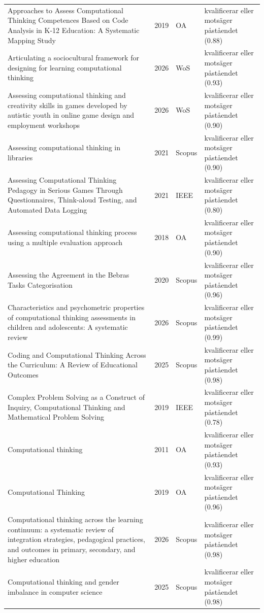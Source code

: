 \begin{longtable}{@{}%
  >{\raggedright\arraybackslash}p{}c%
  >{\raggedright\arraybackslash}p{}%
  >{\raggedright\arraybackslash}p{}@{}}
Approaches to Assess Computational Thinking Competences Based on Code Analysis in K-12 Education: A Systematic Mapping Study & 2019 & OA & kvalificerar eller motsäger påståendet (0.88) \\
Articulating a sociocultural framework for designing for learning computational thinking & 2026 & WoS & kvalificerar eller motsäger påståendet (0.93) \\
Assessing computational thinking and creativity skills in games developed by autistic youth in online game design and employment workshops & 2026 & WoS & kvalificerar eller motsäger påståendet (0.90) \\
Assessing computational thinking in libraries & 2021 & Scopus & kvalificerar eller motsäger påståendet (0.90) \\
Assessing Computational Thinking Pedagogy in Serious Games Through Questionnaires, Think-aloud Testing, and Automated Data Logging & 2021 & IEEE & kvalificerar eller motsäger påståendet (0.80) \\
Assessing computational thinking process using a multiple evaluation approach & 2018 & OA & kvalificerar eller motsäger påståendet (0.90) \\
Assessing the Agreement in the Bebras Tasks Categorisation & 2020 & Scopus & kvalificerar eller motsäger påståendet (0.96) \\
Characteristics and psychometric properties of computational thinking assessments in children and adolescents: A systematic review & 2026 & Scopus & kvalificerar eller motsäger påståendet (0.99) \\
Coding and Computational Thinking Across the Curriculum: A Review of Educational Outcomes & 2025 & Scopus & kvalificerar eller motsäger påståendet (0.98) \\
Complex Problem Solving as a Construct of Inquiry, Computational Thinking and Mathematical Problem Solving & 2019 & IEEE & kvalificerar eller motsäger påståendet (0.78) \\
Computational thinking & 2011 & OA & kvalificerar eller motsäger påståendet (0.93) \\
Computational Thinking & 2019 & OA & kvalificerar eller motsäger påståendet (0.96) \\
Computational thinking across the learning continuum: a systematic review of integration strategies, pedagogical practices, and outcomes in primary, secondary, and higher education & 2026 & Scopus & kvalificerar eller motsäger påståendet (0.98) \\
Computational thinking and gender imbalance in computer science & 2025 & Scopus & kvalificerar eller motsäger påståendet (0.98) \\

\end{longtable}
